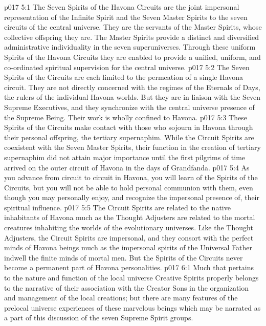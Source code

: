 \vs p017 5:1 The Seven Spirits of the Havona Circuits are the joint impersonal representation of the Infinite Spirit and the Seven Master Spirits to the seven circuits of the central universe. They are the servants of the Master Spirits, whose collective offspring they are. The Master Spirits provide a distinct and diversified administrative individuality in the seven superuniverses. Through these uniform Spirits of the Havona Circuits they are enabled to provide a unified, uniform, and co\hyp{}ordinated spiritual supervision for the central universe.
\vs p017 5:2 The Seven Spirits of the Circuits are each limited to the permeation of a single Havona circuit. They are not directly concerned with the regimes of the Eternals of Days, the rulers of the individual Havona worlds. But they are in liaison with the Seven Supreme Executives, and they synchronize with the central universe presence of the Supreme Being. Their work is wholly confined to Havona.
\vs p017 5:3 These Spirits of the Circuits make contact with those who sojourn in Havona through their personal offspring, the tertiary supernaphim. While the Circuit Spirits are coexistent with the Seven Master Spirits, their function in the creation of tertiary supernaphim did not attain major importance until the first pilgrims of time arrived on the outer circuit of Havona in the days of Grandfanda.
\vs p017 5:4 As you advance from circuit to circuit in Havona, you will learn of the Spirits of the Circuits, but you will not be able to hold personal communion with them, even though you may personally enjoy, and recognize the impersonal presence of, their spiritual influence.
\vs p017 5:5 The Circuit Spirits are related to the native inhabitants of Havona much as the Thought Adjusters are related to the mortal creatures inhabiting the worlds of the evolutionary universes. Like the Thought Adjusters, the Circuit Spirits are impersonal, and they consort with the perfect minds of Havona beings much as the impersonal spirits of the Universal Father indwell the finite minds of mortal men. But the Spirits of the Circuits never become a permanent part of Havona personalities.
\vs p017 6:1 Much that pertains to the nature and function of the local universe Creative Spirits properly belongs to the narrative of their association with the Creator Sons in the organization and management of the local creations; but there are many features of the prelocal universe experiences of these marvelous beings which may be narrated as a part of this discussion of the seven Supreme Spirit groups.

